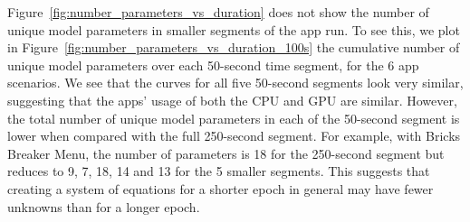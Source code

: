 Figure~\ref{fig:number_parameters_vs_duration} does not show the
number of unique model parameters in smaller segments of the app
run.  To see this, we plot in
Figure~\ref{fig:number_parameters_vs_duration_100s} the cumulative
number of unique model parameters over each 50-second time
segment, for the 6 app scenarios.  We see that the curves for all 
five 50-second segments look very similar, suggesting that the apps'
usage of both the CPU and GPU are similar.  However, the total number
of unique model parameters in each of the 50-second segment is
lower when compared with the full 250-second segment. For example, 
with Bricks Breaker Menu, the number of parameters is 18
for the 250-second segment but
reduces to 9, 7, 18, 14 and 13
for the 5 smaller segments.
This suggests that creating a system of equations for a shorter epoch in general may have
fewer unknowns than for a longer epoch.

\fi



